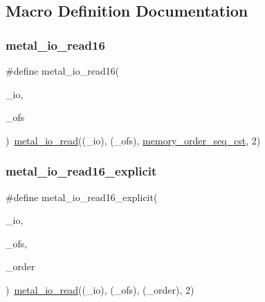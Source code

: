 \subsection{Macro Definition Documentation}
\mbox{\label{group__io_ga3699112c48162e0f30624f4952ef8b7a}} 
\subsubsection{\texorpdfstring{metal\+\_\+io\+\_\+read16}{metal\_io\_read16}}
{\footnotesize\ttfamily \#define metal\+\_\+io\+\_\+read16(\begin{DoxyParamCaption}\item[{}]{\+\_\+io,  }\item[{}]{\+\_\+ofs }\end{DoxyParamCaption})~\hyperlink{group__io_ga0cd8707fcac0d892726f1e946186c531}{metal\+\_\+io\+\_\+read}((\+\_\+io), (\+\_\+ofs), \hyperlink{compiler_2gcc_2atomic_8h_a17c2de5ae768960284c047a320f17d1ba2d21914d1edd227a890107e7878a3752}{memory\+\_\+order\+\_\+seq\+\_\+cst}, 2)}

\mbox{\label{group__io_ga8a63cac7c3fd2277985d23e3f07783a4}} 
\subsubsection{\texorpdfstring{metal\+\_\+io\+\_\+read16\+\_\+explicit}{metal\_io\_read16\_explicit}}
{\footnotesize\ttfamily \#define metal\+\_\+io\+\_\+read16\+\_\+explicit(\begin{DoxyParamCaption}\item[{}]{\+\_\+io,  }\item[{}]{\+\_\+ofs,  }\item[{}]{\+\_\+order }\end{DoxyParamCaption})~\hyperlink{group__io_ga0cd8707fcac0d892726f1e946186c531}{metal\+\_\+io\+\_\+read}((\+\_\+io), (\+\_\+ofs), (\+\_\+order), 2)}

\mbox{\label{group__io_ga53d4cb9c68694eb6421be22148030b2d}} 
